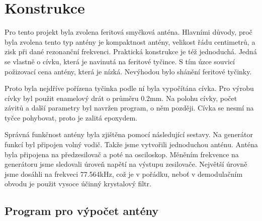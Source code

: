 \newpage

\section{Konstrukce}

Pro tento projekt byla zvolena feritová smyčková anténa. Hlavními důvody, proč byla
zvolena tento typ antény je kompaktnost antény, velikost řádu centimetrů, a zisk při dané
rezonanční frekvenci. Praktická konstrukce je též jednoduchá. Jedná se vlastně o cívku,
která je navinutá na feritové tyčince. S tím úzce souvicí požizovací cena antény, která je
nízká. Nevýhodou bylo shánění feritové tyčinky.

Proto byla nejdříve pořízena tyčinka podle ní byla vypočítána cívka. Pro výrobu cívky byl
použit enamelový drát o průměru 0.2mm. Na polohu cívky, počet závitů a další parametry
byl navržen program, o něm později. Cívka se nesmí na tyčce pohybovat, proto je zalitá
epoxydem.

Správná funkčnost antény byla zjištěna pomocí následující sestavy. Na generátor funkcí byl připojen volný vodič. Takže jsme vytvořili
jednoduchou anténu. Anténa byla připojena na předzesilovač a poté na osciloskop. Měněním
frekvence na generátoru jsme sledovali úroveň napětí na výstupu zesilovače. Největší
úrovně jsme dosáhli na frekveci 77.564kHz, což je v pořádku, neboť v
demodulačním obvodu je použit vysoce účinný krystalový filtr.

\subsection{Program pro výpočet antény}


